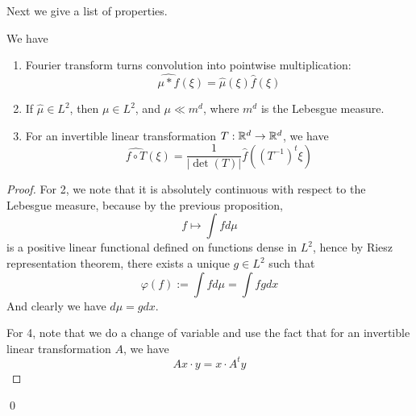 Next we give a list of properties.
\begin{lemma}
    We have 
    \begin{enumerate}
        \item Fourier transform turns convolution into pointwise multiplication:
        \begin{equation*}
            \widehat{\mu\ast f}(\xi)=\hat{\mu}(\xi)\hat{f}(\xi)
        \end{equation*}
        \item If $\hat{\mu}\in L^2$, then $\mu\in L^2$, and $\mu\ll m^d$, where $m^d$ is the Lebesgue measure.
        \item For an invertible linear transformation $T:\mathbb{R}^d\to\mathbb{R}^d$, we have 
        \begin{equation*}
            \widehat{f\circ T}(\xi)=\frac{1}{|\det(T)|}\hat{f}((T^{-1})^t\xi)
        \end{equation*}
    \end{enumerate}
\end{lemma}
\begin{proof}
    For 2, we note that it is absolutely continuous with respect to the Lebesgue measure, because by the previous proposition,
    \begin{equation*}
        f\mapsto \int fd\mu
    \end{equation*}
    is a positive linear functional defined on functions dense in $L^2$, hence by Riesz representation theorem, there exists a unique $g\in L^2$ such that 
    \begin{equation*}
        \varphi(f):=\int fd\mu=\int fgdx
    \end{equation*}
    And clearly we have $d\mu=gdx$.

    For 4, note that we do a change of variable and use the fact that for an invertible linear transformation $A$, we have 
    \begin{equation*}
        Ax\cdot y=x\cdot A^ty
    \end{equation*}
\end{proof}
\qed


